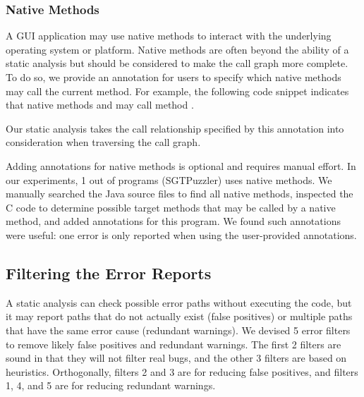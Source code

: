 \subsubsection{Native Methods}
\label{sec:annotation}

A GUI application may use native methods to interact with the underlying
operating system or platform. Native methods are often
beyond the ability of a static analysis but should be considered to make
the call graph more complete. To do so, we provide an annotation 
for users to specify which native methods may call the current method. For example,
the following code snippet indicates that native methods  and 
may call method .

{}

{}


\noindent Our static analysis takes the call relationship specified by this
annotation into consideration when traversing the call graph. 

Adding annotations for native methods is optional and requires manual effort.
In our experiments, 1 out of \subnum programs (SGTPuzzler) uses native methods. We manually
searched the Java source files to find all native methods,
inspected the C code to determine possible target methods
that may be called by a native method, and added \annotationnum annotations for this program.
We found such annotations were useful: one error
is only reported when using the user-provided annotations.


\subsection{Filtering the Error Reports}
\label{sec:heuristic}

A static analysis can check possible error paths without executing the
code, but it may report
paths that do not actually exist (false positives) or multiple paths
that have the same error cause (redundant warnings). We devised
5 error filters to remove likely false positives and redundant warnings.
The first 2 filters are sound in that they will not filter real bugs, and
the other 3 filters are based on heuristics. Orthogonally, filters 2
and 3 are for reducing false positives, and filters 1, 4, and 5
are for reducing redundant warnings.


